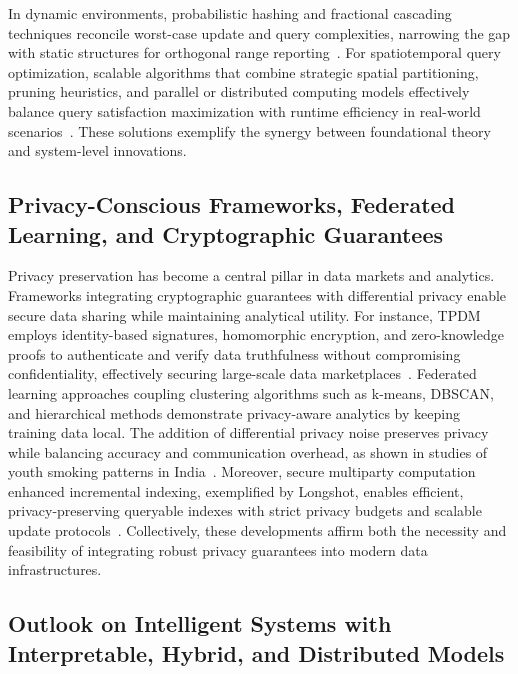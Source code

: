 \documentclass[11pt]{article}
\begin{document}
In dynamic environments, probabilistic hashing and fractional cascading techniques reconcile worst-case update and query complexities, narrowing the gap with static structures for orthogonal range reporting~\cite{ref4}. For spatiotemporal query optimization, scalable algorithms that combine strategic spatial partitioning, pruning heuristics, and parallel or distributed computing models effectively balance query satisfaction maximization with runtime efficiency in real-world scenarios~\cite{ref8}. These solutions exemplify the synergy between foundational theory and system-level innovations.

\subsection{Privacy-Conscious Frameworks, Federated Learning, and Cryptographic Guarantees}

Privacy preservation has become a central pillar in data markets and analytics. Frameworks integrating cryptographic guarantees with differential privacy enable secure data sharing while maintaining analytical utility. For instance, TPDM employs identity-based signatures, homomorphic encryption, and zero-knowledge proofs to authenticate and verify data truthfulness without compromising confidentiality, effectively securing large-scale data marketplaces~\cite{ref28}. Federated learning approaches coupling clustering algorithms such as k-means, DBSCAN, and hierarchical methods demonstrate privacy-aware analytics by keeping training data local. The addition of differential privacy noise preserves privacy while balancing accuracy and communication overhead, as shown in studies of youth smoking patterns in India~\cite{ref23}. Moreover, secure multiparty computation enhanced incremental indexing, exemplified by Longshot, enables efficient, privacy-preserving queryable indexes with strict privacy budgets and scalable update protocols~\cite{ref31}. Collectively, these developments affirm both the necessity and feasibility of integrating robust privacy guarantees into modern data infrastructures.

\subsection{Outlook on Intelligent Systems with Interpretable, Hybrid, and Distributed Models}
\end{document}
